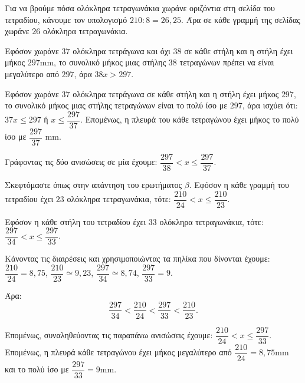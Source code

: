
\begin{alist}
\item Για να βρούμε πόσα ολόκληρα τετραγωνάκια χωράνε οριζόντια στη σελίδα του τετραδίου, κάνουμε τον υπολογισμό $210 : 8 = 26,25$.
Άρα σε κάθε γραμμή της σελίδας χωράνε $26$ ολόκληρα τετραγωνάκια.

\item
\begin{rlist}
\item Εφόσον χωράνε $37$ ολόκληρα τετράγωνα και όχι $38$ σε κάθε στήλη και η στήλη έχει μήκος $297\text{mm}$, το συνολικό μήκος μιας στήλης $38$ τετραγώνων πρέπει να είναι μεγαλύτερο από $297$, άρα $38x > 297$.
\item Εφόσον χωράνε $37$ ολόκληρα τετράγωνα σε κάθε στήλη και η στήλη έχει μήκος $297$, το συνολικό μήκος μιας στήλης τετραγώνων είναι το πολύ ίσο με $297$, άρα ισχύει ότι:
$37x \le 297$ ή $x \le \dfrac{297}{37}$.
Επομένως, η πλευρά του κάθε τετραγώνου έχει μήκος το πολύ ίσο με $\dfrac{297}{37}\text{ mm}$.
\item Γράφοντας τις δύο ανισώσεις σε μία έχουμε:
$\dfrac{297}{38} < x \le \dfrac{297}{37}$.
\end{rlist}

\item Σκεφτόμαστε όπως στην απάντηση του ερωτήματος $\beta$.
Εφόσον η κάθε γραμμή του τετραδίου έχει $23$ ολόκληρα τετραγωνάκια, τότε:
$\dfrac{210}{24} < x \le \dfrac{210}{23}$.

Εφόσον η κάθε στήλη του τετραδίου έχει $33$ ολόκληρα τετραγωνάκια, τότε:
$\dfrac{297}{34} < x \le \dfrac{297}{33}$.

Κάνοντας τις διαιρέσεις και χρησιμοποιώντας τα πηλίκα που δίνονται έχουμε:
$\dfrac{210}{24} = 8,75$, $\dfrac{210}{23} \simeq 9,23$, $\dfrac{297}{34} \simeq 8,74$, $\dfrac{297}{33} = 9$.

Άρα:
\[\dfrac{297}{34} < \dfrac{210}{24} < \dfrac{297}{33} < \dfrac{210}{23}.\]

Επομένως, συναληθεύοντας τις παραπάνω ανισώσεις έχουμε:
$\dfrac{210}{24} < x \le \dfrac{297}{33}$.
Επομένως, η πλευρά κάθε τετραγώνου έχει μήκος μεγαλύτερο από $\dfrac{210}{24} = 8,75\text{mm}$ και το πολύ ίσο με $\dfrac{297}{33} = 9\text{mm}$.
\end{alist}

